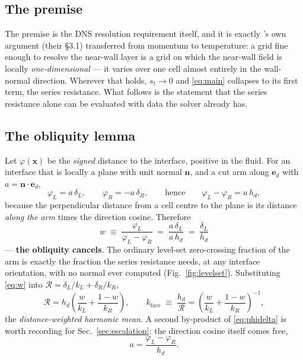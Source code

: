 \documentclass[11pt,a4paper]{article}
\newcommand{\ed}{\boldsymbol{e}_d}
\newcommand{\nn}{\boldsymbol{n}}
\newcommand{\Rser}{\mathcal{R}}
\begin{document}
\subsection{The premise}

The premise is the DNS resolution requirement itself, and it is exactly
\cite{luchini2025}'s own argument (their \S3.1) transferred from momentum to
temperature: a grid fine enough to resolve the near-wall layer is a grid on
which the near-wall field is locally \emph{one-dimensional} --- it varies over
one cell almost entirely in the wall-normal direction. Wherever that holds,
$s_t\to0$ and \eqref{eq:main} collapses to its first term, the series
resistance. What follows is the statement that the series resistance alone can
be evaluated with data the solver already has.

\subsection{The obliquity lemma}
\label{sec:lemma}

Let $\varphi(\boldsymbol{x})$ be the \emph{signed} distance to the interface,
positive in the fluid. For an interface that is locally a plane with unit normal
$\nn$, and a cut arm along $\ed$ with $a=\nn\cdot\ed$,
\begin{equation}
  \varphi_L = a\,\delta_L,
  \qquad
  \varphi_R = -a\,\delta_R,
  \qquad\text{hence}\qquad
  \varphi_L-\varphi_R = a\,h_d ,
  \label{eq:phidelta}
\end{equation}
because the perpendicular distance from a cell centre to the plane is its
distance \emph{along the arm} times the direction cosine. Therefore
\begin{equation}
  \boxed{\;
  w \;\equiv\; \frac{\varphi_L}{\varphi_L-\varphi_R}
    \;=\; \frac{a\,\delta_L}{a\,h_d}
    \;=\; \frac{\delta_L}{h_d}
  \;}
  \label{eq:w}
\end{equation}
--- \textbf{the obliquity cancels}. The ordinary level-set zero-crossing
fraction of the arm is exactly the fraction the series resistance needs, at any
interface orientation, with no normal ever computed
(Fig.~\ref{fig:levelset}). Substituting \eqref{eq:w} into
$\Rser=\delta_L/k_L+\delta_R/k_R$,
\begin{equation}
  \Rser = h_d\left(\frac{w}{k_L}+\frac{1-w}{k_R}\right),
  \qquad
  k_{\text{face}} \;\equiv\; \frac{h_d}{\Rser}
    = \left(\frac{w}{k_L}+\frac{1-w}{k_R}\right)^{-1},
  \label{eq:kface}
\end{equation}
the \emph{distance-weighted harmonic mean}. A second by-product of
\eqref{eq:phidelta} is worth recording for Sec.~\ref{sec:escalation}: the
direction cosine itself comes free,
\begin{equation}
  a=\frac{\varphi_L-\varphi_R}{h_d}.
  \label{eq:afree}
\end{equation}
\end{document}
